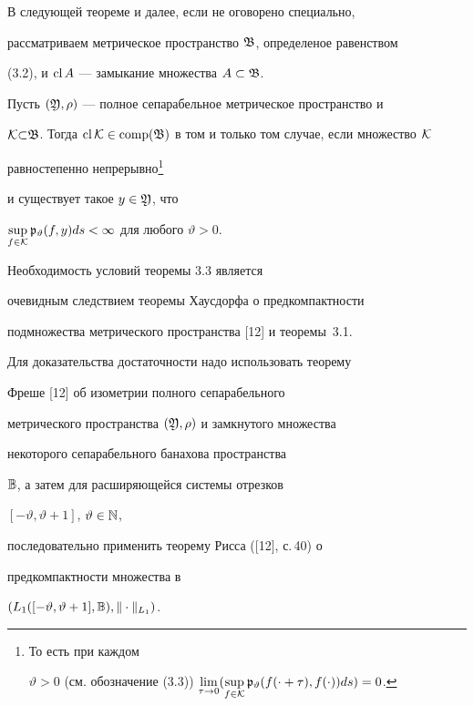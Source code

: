 В следующей теореме и далее, если не оговорено специально,


рассматриваем метрическое пространство $\frak B$, определеное равенством


(3.2), и $\operatorname{cl} A$ --- замыкание множества $A\subset\frak B$.








\begin{thms}


Пусть $(\frak Y,\rho)$ --- полное сепарабельное метрическое пространство и


$\cal K{\subset}\frak B$. Тогда $\cl\cal K\in


\comp(\frak B)$ в том и только том случае, если множество $\cal K$


равностепенно \label{foot3} не\-пре\-рыв\-но\footnote{То есть при каждом


$\vartheta>0$ (см. обозначение (3.3)) $\lim\limits_{\tau\to


0}(\sup\limits_{f\in\cal K}\frak p_\vartheta


(f(\cdot+\tau),f(\cdot))ds)=0$.}


и существует такое $y\in\frak Y$, что


$\sup\limits_{f\in\cal K}


\frak p_\vartheta(f,y)ds<\infty$ для любого $\vartheta>0$.


\end{thms}


\setcounter{footnote}{0}








\begin{pf}


Необходимость условий теоремы 3.3 является


очевидным следствием теоремы Хаусдорфа о предкомпактности


подмножества метрического пространства [12] и теоремы~3.1.





Для доказательства достаточности надо использовать теорему


Фреше [12] об изометрии полного сепарабельного


метрического пространства $(\frak Y,\rho)$ и замкнутого множества


некоторого сепарабельного банахова пространства


$\Bbb B$, а затем для расширяющейся системы отрезков


$[-\vartheta,\vartheta+1]$, $\vartheta\in\Bbb N$,


последовательно применить теорему Рисса ([12], с.\,40) о


предкомпактности множества в


$(L_1([-\vartheta,\vartheta+1],\Bbb B),\|\cdot\|_{L_1})$.


\end{pf}





